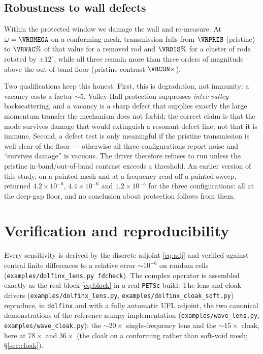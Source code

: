 \documentclass[11pt]{article}
\begin{document}
\subsection{Robustness to wall defects}
Within the protected window we damage the wall and re-measure. At
$\omega=\VROMEGA$ on a conforming mesh, transmission falls from $\VRPRIS$
(pristine) to $\VRVAC\%$ of that value for a removed rod and $\VRDIS\%$ for a
cluster of rods rotated by $\pm12^\circ$, while all three remain more than three
orders of magnitude above the out-of-band floor (pristine contrast $\VRCON\times$).

Two qualifications keep this honest. First, this is degradation, not immunity: a
vacancy costs a factor $\sim\!5$. Valley-Hall protection suppresses
\emph{inter-valley} backscattering, and a vacancy is a sharp defect that supplies
exactly the large momentum transfer the mechanism does not forbid; the correct
claim is that the mode survives damage that would extinguish a resonant defect
line, not that it is immune. Second, a defect test is only meaningful if the
pristine transmission is well clear of the floor --- otherwise all three
configurations report noise and ``survives damage'' is vacuous. The driver
therefore refuses to run unless the pristine in-band/out-of-band contrast exceeds
a threshold. An earlier version of this study, on a painted mesh and at a
frequency read off a painted sweep, returned $4.2\times10^{-6}$,
$4.4\times10^{-6}$ and $1.2\times10^{-5}$ for the three configurations: all at
the deep-gap floor, and no conclusion about protection follows from them.

\section{Verification and reproducibility}
Every sensitivity is derived by the discrete adjoint \eqref{eq:adj} and verified
against central finite differences to a relative error $\sim\!10^{-6}$ on random
cells (\texttt{examples/dolfinx\_lens.py fdcheck}). The complex operator is
assembled exactly as the real block \eqref{eq:block} in a real \texttt{PETSc}
build. The lens and cloak drivers (\texttt{examples/dolfinx\_lens.py},
\texttt{examples/dolfinx\_cloak\_soft.py}) reproduce, in \texttt{dolfinx} and with
a fully automatic UFL adjoint, the two canonical demonstrations of the reference
numpy implementation (\texttt{examples/wave\_lens.py},
\texttt{examples/wave\_cloak.py}): the $\sim\!20\times$ single-frequency lens and
the $\sim\!15\times$ cloak, here at $78\times$ and $36\times$ (the cloak on a conforming rather than soft-void mesh; \S\ref{sec:cloak}).
\end{document}
